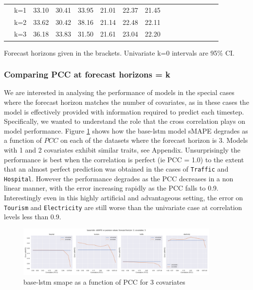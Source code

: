 \documentclass[letterpaper]{article}
\newcommand{\pearson}{PCC}
\begin{document}
\begin{table}[tbp]
\begin{threeparttable}
\begin{small}
\begin{tabular}{c|c|cccccccccccccc}
    & k=1 & 33.10 & 30.41 & 33.95 & 21.01 & 22.37 & 21.45 \\
    & k=2 & 33.62 & 30.42 & 38.16 & 21.14 & 22.48 & 22.11 \\
    & k=3 & 36.18 & 33.83 & 31.50 & 21.61 & 23.04 & 22.20 \\
    \bottomrule
  \end{tabular}
  \begin{tablenotes}
    \item Forecast horizons given in the brackets. Univariate k=0 intervals are 95\% CI.
  \end{tablenotes}
  \end{small}
  \end{threeparttable}
  \label{tab:covariate_results}
  \vspace{-15pt}
\end{table}

\subsubsection{Comparing PCC at forecast horizons = k}
We are interested in analysing the performance of models in the special cases where the forecast horizon matches the number of covariates, as in these cases the model 
is effectively provided with information required to predict each timestep. Specifically, we wanted to understand the role that the cross correlation plays 
on model performance. Figure \ref{fig:base_lstm_k_3_smape_vs_pearson} shows how the base-lstm model sMAPE degrades as a function of $\pearson$ on each of the datasets where the 
forecast horizon is 3. Models with 1 and 2 covariates exhibit similar traits, see Appendix. Unsurprisingly the performance is best when the correlation 
is perfect (ie PCC = 1.0) to the extent that an almost perfect prediction was obtained in the cases of \texttt{Traffic} and \texttt{Hospital}. However the performance degrades as the PCC decreases 
in a non linear manner, with the error increasing rapidly as the PCC falls to 0.9. Interestingly even in this highly artificial and advantageous setting, the error on \texttt{Tourism} 
and \texttt{Electricity} are still worse than the univariate case at correlation levels less than 0.9.
\begin{figure}[ht]
\centering
\includegraphics[width=0.9\textwidth]{figures/base-lstm_k_3_smape_vs_pearson.png}
\caption{base-lstm smape as a function of PCC for 3 covariates}
\label{fig:base_lstm_k_3_smape_vs_pearson}
\end{figure}
\end{document}

